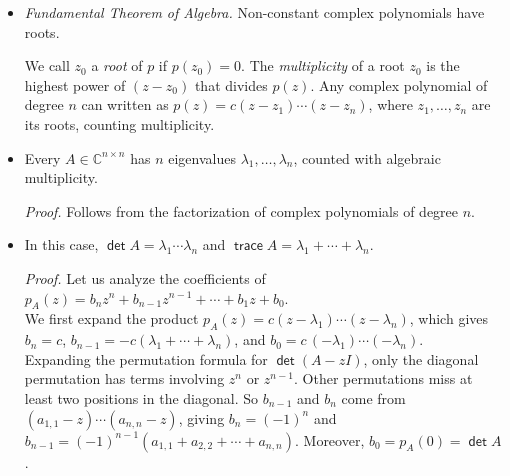 \documentclass[11pt]{article}
\newcommand{\1}{\mathbf{1}}
\newcommand{\0}{\mathbf{0}}
\newcommand{\C}{\mathbb{C}}
\newcommand{\F}{\mathbb{F}}
\newcommand{\R}{\mathbb{R}}
\DeclareMathOperator{\mytrace}{\mathsf{trace}}
\DeclareMathOperator{\mydet}{\mathsf{det}}
\begin{document}

\begin{itemize}

\item

\emph{Fundamental Theorem of Algebra.}
Non-constant complex polynomials have roots.

We call $z_0$ a \emph{root} of $p$ if $p(z_0)=0$.
The \emph{multiplicity} of a root $z_0$ is the highest power of $(z-z_0)$ that divides $p(z)$.
Any complex polynomial of degree $n$ can written as $p(z)=c(z-z_1)\cdots(z-z_n)$, where $z_1,\dots,z_n$ are its roots, counting multiplicity.

\item



Every $A \in \C^{n \times n}$ has $n$ eigenvalues $\lambda_1,\dots,\lambda_n$, counted with algebraic multiplicity.

\emph{Proof.}
Follows from the factorization of complex polynomials of degree $n$.


\item

In this case,
$\mydet A = \lambda_1 \cdots \lambda_n$
and
$\mytrace A = \lambda_1 + \cdots + \lambda_n$.

\emph{Proof.}
Let us analyze the coefficients of $p_A(z)=b_n z^n + b_{n-1} z^{n-1} + \cdots + b_1 z + b_0$.
\\
We first expand the product $p_A(z) = c(z-\lambda_1)\cdots(z-\lambda_n)$, which gives $b_n = c$, $b_{n-1} = -c (\lambda_1 + \cdots + \lambda_n)$, and $b_0 = c \, (-\lambda_1)\cdots(-\lambda_n)$.
\\
Expanding the permutation formula for $\mydet(A - z I)$, only the diagonal permutation has terms involving $z^n$ or $z^{n-1}$.
Other permutations miss at least two positions in the diagonal.
So $b_{n-1}$ and $b_n$ come from $(a_{1,1}-z)\cdots(a_{n,n}-z)$, giving $b_n = (-1)^n$ and $b_{n-1}=(-1)^{n-1}(a_{1,1} + a_{2,2} + \cdots + a_{n,n})$.
Moreover, $b_0 = p_A(0) = \mydet A$.

\end{itemize}
\end{document}
